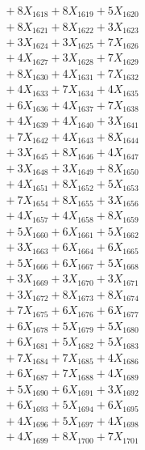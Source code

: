 \documentclass[a4paper,10pt]{article}
\begin{document}
{\begin{align}
&\;  + 8 X_{1618} + 8 X_{1619} + 5 X_{1620} \\[0.3ex]
&\;  + 8 X_{1621} + 8 X_{1622} + 3 X_{1623} \\[0.3ex]
&\;  + 3 X_{1624} + 3 X_{1625} + 7 X_{1626} \\[0.3ex]
&\;  + 4 X_{1627} + 3 X_{1628} + 7 X_{1629} \\[0.5ex]\allowbreak
&\;  + 8 X_{1630} + 4 X_{1631} + 7 X_{1632} \\[0.3ex]
&\;  + 4 X_{1633} + 7 X_{1634} + 4 X_{1635} \\[0.3ex]
&\;  + 6 X_{1636} + 4 X_{1637} + 7 X_{1638} \\[0.3ex]
&\;  + 4 X_{1639} + 4 X_{1640} + 3 X_{1641} \\[0.3ex]
&\;  + 7 X_{1642} + 4 X_{1643} + 8 X_{1644} \\[0.3ex]
&\;  + 3 X_{1645} + 8 X_{1646} + 4 X_{1647} \\[0.3ex]
&\;  + 3 X_{1648} + 3 X_{1649} + 8 X_{1650} \\[0.3ex]
&\;  + 4 X_{1651} + 8 X_{1652} + 5 X_{1653} \\[0.3ex]
&\;  + 7 X_{1654} + 8 X_{1655} + 3 X_{1656} \\[0.3ex]
&\;  + 4 X_{1657} + 4 X_{1658} + 8 X_{1659} \\[0.5ex]\allowbreak
&\;  + 5 X_{1660} + 6 X_{1661} + 5 X_{1662} \\[0.3ex]
&\;  + 3 X_{1663} + 6 X_{1664} + 6 X_{1665} \\[0.3ex]
&\;  + 5 X_{1666} + 6 X_{1667} + 5 X_{1668} \\[0.3ex]
&\;  + 3 X_{1669} + 3 X_{1670} + 3 X_{1671} \\[0.3ex]
&\;  + 3 X_{1672} + 8 X_{1673} + 8 X_{1674} \\[0.3ex]
&\;  + 7 X_{1675} + 6 X_{1676} + 6 X_{1677} \\[0.3ex]
&\;  + 6 X_{1678} + 5 X_{1679} + 5 X_{1680} \\[0.3ex]
&\;  + 6 X_{1681} + 5 X_{1682} + 5 X_{1683} \\[0.3ex]
&\;  + 7 X_{1684} + 7 X_{1685} + 4 X_{1686} \\[0.3ex]
&\;  + 6 X_{1687} + 7 X_{1688} + 4 X_{1689} \\[0.5ex]\allowbreak
&\;  + 5 X_{1690} + 6 X_{1691} + 3 X_{1692} \\[0.3ex]
&\;  + 6 X_{1693} + 5 X_{1694} + 6 X_{1695} \\[0.3ex]
&\;  + 4 X_{1696} + 5 X_{1697} + 4 X_{1698} \\[0.3ex]
&\;  + 4 X_{1699} + 8 X_{1700} + 7 X_{1701} \\[0.3ex]

\end{align}}
\end{document}
